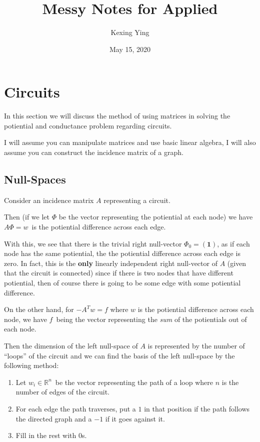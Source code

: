 \documentclass[]{article}
\title{Messy Notes for Applied}
\author{Kexing Ying}
\date{May 15, 2020}
\begin{document}
\maketitle

{
\hypersetup{linkcolor=black}
\setcounter{tocdepth}{3}
\tableofcontents
}
\newpage

\section{Circuits}\label{circuits}

In this section we will discuss the method of using matrices in solving
the potiential and conductance problem regarding circuits.

I will assume you can manipulate matrices and use basic linear algebra,
I will also assume you can construct the incidence matrix of a graph.

\subsection{Null-Spaces}\label{null-spaces}

Consider an incidence matrix \(A\) representing a circuit.

Then (if we let \(\Phi\) be the vector representing the potiential at
each node) we have \(A \Phi = w\)~is the potiential difference across
each edge.

With this, we see that there is the trivial right null-vector
\(\Phi_0 = \left(\mathbf{1} \right)\), as if each node has the same
potiential, the the potiential difference across each edge is zero. In
fact, this is the \textbf{only} linearly independent right null-vector
of \(A\) (given that the circuit is connected) since if there is two
nodes that have different potiential, then of course there is going to
be some edge with some potiential difference.

On the other hand, for \(-A^T w = f\) where \(w\) is the potiential
difference across each node, we have \(f\)~being the vector representing
the \emph{sum} of the potientials out of each node.

Then the dimension of the left null-space of \(A\) is represented by the
number of ``loops'' of the circuit and we can find the basis of the left
null-space by the following method:

\begin{enumerate}
\def\labelenumi{\arabic{enumi}.}
\item
  Let \(w_i \in \mathbb{R}^n\)~be the vector representing the path of a
  loop where \(n\) is the number of edges of the circuit.
\item
  For each edge the path traverses, put a \(1\) in that position if the
  path follows the directed graph and a \(-1\) if it goes against it.
\item
  Fill in the rest with \(0\)s.
\end{enumerate}
\end{document}
